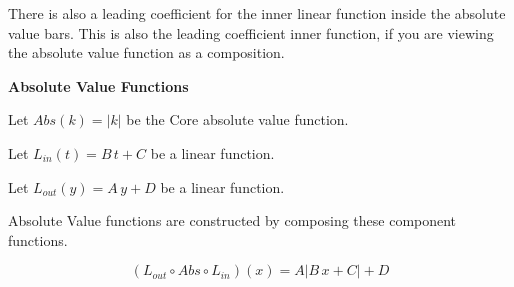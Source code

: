 \documentclass{ximera}
\begin{document}
There is also a leading coefficient for the inner linear function inside the absolute value bars. This is also the leading coefficient inner function, if you are viewing the absolute value function as a composition.













\begin{idea} \textbf{\textcolor{blue!55!black}{Absolute Value Functions}}


Let $Abs(k) = |k| $ be the Core absolute value function.

Let $L_{in}(t) = B \, t + C$ be a linear function.

Let $L_{out}(y) = A \, y + D$ be a linear function.


Absolute Value functions are constructed by composing these component functions.


\[
(L_{out} \circ Abs \circ L_{in})(x) = A |B \,x + C| + D
\]




\end{idea}
\end{document}
